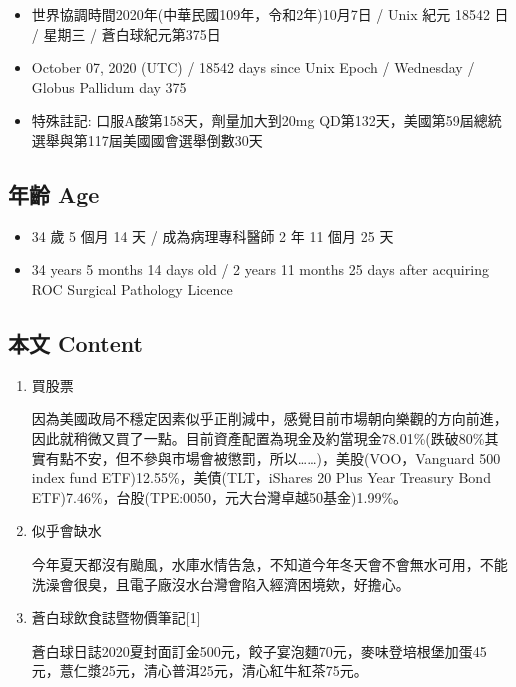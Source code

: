 \documentclass[
]{article}
\providecommand{\tightlist}{%
  \setlength{\itemsep}{0pt}\setlength{\parskip}{0pt}}
\begin{document}
\begin{itemize}
\tightlist
\item
  世界協調時間2020年(中華民國109年，令和2年)10月7日 / Unix 紀元 18542 日
  / 星期三 / 蒼白球紀元第375日
\item
  October 07, 2020 (UTC) / 18542 days since Unix Epoch / Wednesday /
  Globus Pallidum day 375
\item
  特殊註記: 口服A酸第158天，劑量加大到20mg
  QD第132天，美國第59屆總統選舉與第117屆美國國會選舉倒數30天
\end{itemize}

\hypertarget{ux5e74ux9f61-age-34}{%
\subsection{年齡 Age}\label{ux5e74ux9f61-age-34}}

\begin{itemize}
\tightlist
\item
  34 歲 5 個月 14 天 / 成為病理專科醫師 2 年 11 個月 25 天
\item
  34 years 5 months 14 days old / 2 years 11 months 25 days after
  acquiring ROC Surgical Pathology Licence
\end{itemize}

\hypertarget{ux672cux6587-content-34}{%
\subsection{本文 Content}\label{ux672cux6587-content-34}}

\begin{enumerate}
\def\labelenumi{\arabic{enumi}.}
\item
  買股票

  因為美國政局不穩定因素似乎正削減中，感覺目前市場朝向樂觀的方向前進，因此就稍微又買了一點。目前資產配置為現金及約當現金78.01\%(跌破80\%其實有點不安，但不參與市場會被懲罰，所以\ldots\ldots)，美股(VOO，Vanguard
  500 index fund ETF)12.55\%，美債(TLT，iShares 20 Plus Year Treasury
  Bond ETF)7.46\%，台股(TPE:0050，元大台灣卓越50基金)1.99\%。
\item
  似乎會缺水

  今年夏天都沒有颱風，水庫水情告急，不知道今年冬天會不會無水可用，不能洗澡會很臭，且電子廠沒水台灣會陷入經濟困境欸，好擔心。
\item
  蒼白球飲食誌暨物價筆記{[}1{]}

  蒼白球日誌2020夏封面訂金500元，餃子宴泡麵70元，麥味登培根堡加蛋45元，薏仁漿25元，清心普洱25元，清心紅牛紅茶75元。
\end{enumerate}
\end{document}
